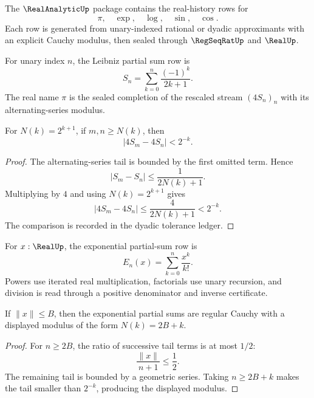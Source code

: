 \begin{definition}
\label{def:analysis-spine-real-analytic-package}
The $\RealAnalyticUp$ package contains the real-history rows for
$$
\pi,\quad \exp,\quad \log,\quad \sin,\quad \cos .
$$
Each row is generated from unary-indexed rational or dyadic approximants with
an explicit Cauchy modulus, then sealed through $\RegSeqRatUp$ and $\RealUp$.
\end{definition}

\begin{definition}
\label{def:analysis-spine-pi}
For unary index $n$, the Leibniz partial sum row is
$$
S_n=\sum_{k=0}^{n}\frac{(-1)^k}{2k+1}.
$$
The real name $\pi$ is the sealed completion of the rescaled stream
$(4S_n)_n$ with its alternating-series modulus.
\end{definition}

\begin{theorem}
\label{thm:analysis-spine-leibniz-modulus}
For $N(k)=2^{k+1}$, if $m,n\ge N(k)$, then
$$
|4S_m-4S_n|<2^{-k}.
$$
\end{theorem}

\begin{proof}
The alternating-series tail is bounded by the first omitted term.  Hence
$$
|S_m-S_n|\le \frac{1}{2N(k)+1}.
$$
Multiplying by $4$ and using $N(k)=2^{k+1}$ gives
$$
|4S_m-4S_n|\le \frac{4}{2N(k)+1}<2^{-k}.
$$
The comparison is recorded in the dyadic tolerance ledger.
\end{proof}

\begin{definition}
\label{def:analysis-spine-exp-part}
For $x:\RealUp$, the exponential partial-sum row is
$$
E_n(x)=\sum_{k=0}^{n}\frac{x^k}{k!}.
$$
Powers use iterated real multiplication, factorials use unary recursion, and
division is read through a positive denominator and inverse certificate.
\end{definition}

\begin{theorem}
\label{thm:analysis-spine-exp-modulus}
If $\lVert x\rVert\le B$, then the exponential partial sums are regular
Cauchy with a displayed modulus of the form $N(k)=2B+k$.
\end{theorem}

\begin{proof}
For $n\ge2B$, the ratio of successive tail terms is at most $1/2$:
$$
\frac{\lVert x\rVert}{n+1}\le\frac12.
$$
The remaining tail is bounded by a geometric series.  Taking
$n\ge2B+k$ makes the tail smaller than $2^{-k}$, producing the displayed
modulus.
\end{proof}

